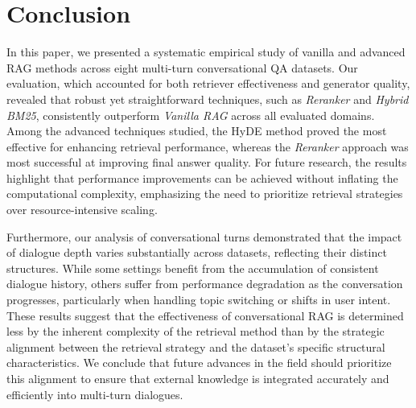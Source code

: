 \documentclass[11pt]{article}
\begin{document}
\section{Conclusion} \label{sec:conclusion}

In this paper, we presented a systematic empirical study of vanilla and advanced RAG methods across eight multi-turn conversational QA datasets. Our evaluation, which accounted for both retriever effectiveness and generator quality, revealed that robust yet straightforward techniques, such as \textit{Reranker} and \textit{Hybrid BM25},  consistently outperform \textit{Vanilla RAG} across all evaluated domains. Among the advanced techniques studied, the HyDE method proved the most effective for enhancing retrieval performance, whereas the \textit{Reranker} approach was most successful at improving final answer quality. For future research, the results highlight that performance improvements can be achieved without inflating the computational complexity, emphasizing the need to prioritize retrieval strategies over resource-intensive scaling. 

Furthermore, our analysis of conversational turns demonstrated that the impact of dialogue depth varies substantially across datasets, reflecting their distinct structures. While some settings benefit from the accumulation of consistent dialogue history, others suffer from performance degradation as the conversation progresses, particularly when handling topic switching or shifts in user intent. These results suggest that the effectiveness of conversational RAG is determined less by the inherent complexity of the retrieval method than by the strategic alignment between the retrieval strategy and the dataset's specific structural characteristics. We conclude that future advances in the field should prioritize this alignment to ensure that external knowledge is integrated accurately and efficiently into multi-turn dialogues.



\end{document}
